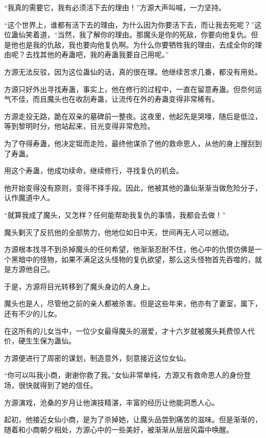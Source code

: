 
\begin{this_body}

“我真的需要它，我有必须活下去的理由！”方源大声叫喊，一力坚持。

“这个世界上，谁都有活下去的理由，为什么因为你要活下去，而让我去死呢？”这位蛊仙笑着道，“当然，我了解你的理由。那魔头是你的死敌，你要向他复仇。但是他也是我的仇敌，我也要向他复仇啊。为什么你要牺牲我的理由，去成全你的理由呢？去找其他的寿蛊吧，我的寿蛊我要自己用呢。”

方源无法反驳，因为这位蛊仙的话，真的很在理。他继续苦求几番，都没有用处。

方源只好外出寻找寿蛊，事实上，他在修行的过程中，一直在留意寿蛊。但奈何运气不佳，而且魔头也在收刮寿蛊，让流传在外的寿蛊变得非常稀有。

方源走投无路，跪在双亲的墓碑前一整夜。这夜里，他起先是哭嚎，随后是低泣，等到黎明时分，他站起来，目光变得非常危险。

为了夺得寿蛊，他决定铤而走险，最终他谋杀了他的救命恩人，从他的身上搜刮到了寿蛊。

用这个寿蛊，他成功续命，继续修行，寻找复仇的机会。

他开始变得没有原则，变得不择手段。因此，他被其他的蛊仙渐渐当做危险分子，认作魔道中人。

“就算我成了魔头，又怎样？任何能帮助我复仇的事情，我都会去做！”

魔头剿灭了反抗他的全部势力，他地位如日中天，世间再无人可以撼动。

方源根本找寻不到杀掉魔头的任何希望，他渐渐忍耐不住，他心中的仇恨仿佛是一个黑暗中的怪物，如果不满足这头怪物的复仇欲望，那么这头怪物首先吞噬的，就是方源他自己。

于是，方源将目光转移到了魔头身边的人身上。

魔头也是人，尽管他之前的亲人都被杀害。但是这些年来，他亦有了妻室，属下，还有不少的儿女。

在这所有的儿女当中，一位少女最得魔头的溺爱，才十六岁就被魔头耗费惊人代价，硬生生保为蛊仙。

方源便进行了周密的谋划，制造意外，刻意接近这位女仙。

“你可以叫我小商，谢谢你救了我。”女仙非常单纯，方源又有救命恩人的身份登场，很快就得到了她的信任。

方源演戏，沧桑的岁月让他演技精湛，丰富的经历让他能洞悉人心。

起初，他接近女仙小商，是为了杀掉她，让魔头品尝到痛苦的滋味。但是渐渐的，随着和小商朝夕相处，方源心中的一些美好，被渐渐从层层风霜中唤醒。


\end{this_body}

